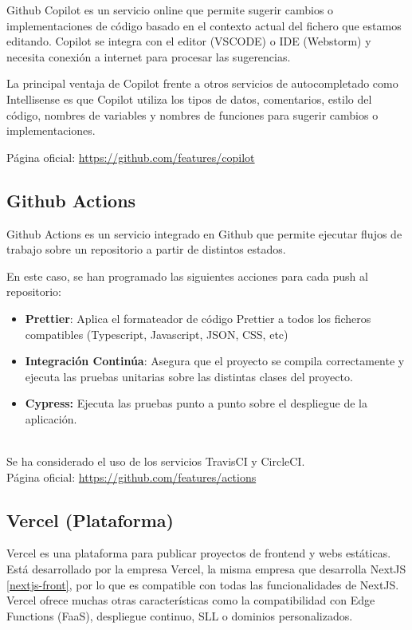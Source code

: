 Github Copilot es un servicio online que permite sugerir cambios o
implementaciones de código basado en el contexto actual del fichero que
estamos editando. Copilot se integra con el editor (VSCODE) o IDE
(Webstorm) y necesita conexión a internet para procesar las sugerencias.

La principal ventaja de Copilot frente a otros servicios de
autocompletado como Intellisense es que Copilot utiliza los tipos de
datos, comentarios, estilo del código, nombres de variables y nombres de
funciones para sugerir cambios o implementaciones.

Página oficial: \href{https://github.com/features/copilot}{https://github.com/features/copilot}

\hypertarget{github-actions}{%
\subsection{Github Actions}\label{github-actions}}

Github Actions es un servicio integrado en Github que permite ejecutar
flujos de trabajo sobre un repositorio a partir de distintos estados.

En este caso, se han programado las siguientes acciones para cada push
al repositorio:

\begin{itemize}
\itemsep0em 
\item
  \textbf{Prettier}: Aplica el formateador de código Prettier a todos
  los ficheros compatibles (Typescript, Javascript, JSON, CSS, etc)
\item
  \textbf{Integración Continúa}: Asegura que el proyecto se compila
  correctamente y ejecuta las pruebas unitarias sobre las distintas
  clases del proyecto.
\item
  \textbf{Cypress:} Ejecuta las pruebas punto a punto sobre el
  despliegue de la aplicación.
\end{itemize}\\
Se ha considerado el uso de los servicios TravisCI y CircleCI.\\
Página oficial: \href{https://github.com/features/actions}{https://github.com/features/actions}

\hypertarget{vercel-plataforma}{%
\subsection{Vercel (Plataforma)}\label{vercel-plataforma}}

Vercel es una plataforma para publicar proyectos de frontend y webs
estáticas. Está desarrollado por la empresa Vercel, la misma empresa que
desarrolla NextJS \ref{nextjs-front}, por lo que es compatible con todas las
funcionalidades de NextJS.\\
Vercel ofrece muchas otras características como la compatibilidad con Edge Functions (FaaS), despliegue continuo, SLL o dominios personalizados. 

